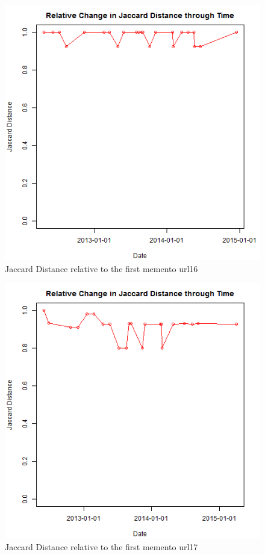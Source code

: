 \begin{figure}[ht]
	\begin{center}
		 \includegraphics[scale=0.60]{url16}
		  \caption{Jaccard Distance relative to the first memento url16}
	 \end{center}
\end{figure}
\clearpage
\begin{figure}[ht]
	\begin{center}
		 \includegraphics[scale=0.60]{url17}
		  \caption{Jaccard Distance relative to the first memento url17}
	 \end{center}
\end{figure}
